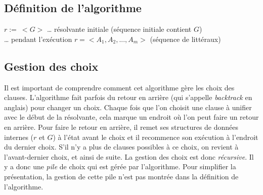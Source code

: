 \subsection{Définition de l'algorithme}

\begin{algorithm}[H]
$r :=\ <G>$ … résolvante initiale (séquence initiale contient $G$) \\
… pendant l'exécution $r= <A_{1},A_{2},...,A_{m}>$ (séquence de littéraux)\\
\end{algorithm}

\subsection{Gestion des choix}

Il est important de comprendre comment cet algorithme gère les choix des clauses.
L'algorithme fait parfois du retour en arrière (qui s'appelle {\em backtrack} en anglais) pour changer un choix.
Chaque fois que l'on choisit une clause à unifier avec le début de la résolvante,
cela marque un endroit où l'on peut faire un retour en arrière. 
Pour faire le retour en arrière,
il remet ses structures de données internes ($r$ et $G$) à l'état avant le choix
et il recommence son exécution à l'endroit du dernier choix.
S'il n'y a plus de clauses possibles à ce choix,
on revient à l'avant-dernier choix, et ainsi de suite.
La gestion des choix est donc {\em récursive}.
Il y a donc une {\em pile} de choix qui est gérée par l'algorithme.
Pour simplifier la présentation, la gestion de cette pile n'est pas montrée dans la définition de l'algorithme.

